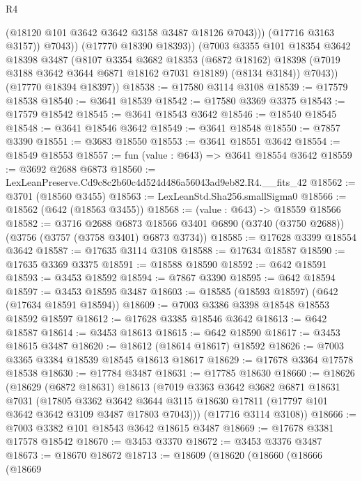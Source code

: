 \begin{lexlean}{R4}
\begin{coremodule}
                    (@18120 @101 @3642 @3642 @3158 @3487 @18126 @7043)))
                (@17716 @3163 @3157))
              @7043))
          (@17770 @18390 @18393))
        (@7003
          @3355
          @101
          @18354
          @3642
          @18398
          @3487
          (@8107
            @3354
            @3682
            @18353
            (@6872 @18162)
            @18398
            (@7019 @3188 @3642 @3644 @6871 @18162 @7031 @18189)
            (@8134 @3184))
          @7043))
      (@17770 @18394 @18397))
@18538 := @17580 @3114 @3108
@18539 := @17579 @18538
@18540 := @3641 @18539
@18542 := @17580 @3369 @3375
@18543 := @17579 @18542
@18545 := @3641 @18543 @3642
@18546 := @18540 @18545
@18548 := @3641 @18546 @3642
@18549 := @3641 @18548
@18550 := @7857 @3390
@18551 := @3683 @18550
@18553 := @3641 @18551 @3642
@18554 := @18549 @18553
@18557 := fun (value : @643) => @3641 @18554 @3642
@18559 := @3692 @2688 @6873
@18560 := LexLeanPreserve.Cd9c8c2b60c4d524d486a56043ad9eb82.R4.__fits_42
@18562 := @3701 (@18560 @3455)
@18563 := LexLeanStd.Sha256.smallSigma0
@18566 := @18562 (@642 (@18563 @3455))
@18568 := (value : @643) -> @18559 @18566
@18582 := @3716
    @2688
    @6873
    @18566
    @3401
    @6890
    (@3740 (@3750 @2688))
    (@3756 (@3757 (@3758 @3401) @6873 @3734))
@18585 := @17628 @3399 @18554 @3642
@18587 := @17635 @3114 @3108
@18588 := @17634 @18587
@18590 := @17635 @3369 @3375
@18591 := @18588 @18590
@18592 := @642 @18591
@18593 := @3453 @18592
@18594 := @7867 @3390
@18595 := @642 @18594
@18597 := @3453 @18595 @3487
@18603 := @18585 (@18593 @18597) (@642 (@17634 @18591 @18594))
@18609 := @7003 @3386 @3398 @18548 @18553 @18592 @18597
@18612 := @17628 @3385 @18546 @3642
@18613 := @642 @18587
@18614 := @3453 @18613
@18615 := @642 @18590
@18617 := @3453 @18615 @3487
@18620 := @18612 (@18614 @18617) @18592
@18626 := @7003 @3365 @3384 @18539 @18545 @18613 @18617
@18629 := @17678 @3364 @17578 @18538
@18630 := @17784 @3487
@18631 := @17785 @18630
@18660 := @18626
    (@18629
      (@6872 @18631)
      @18613
      (@7019
        @3363
        @3642
        @3682
        @6871
        @18631
        @7031
        (@17805
          @3362
          @3642
          @3644
          @3115
          @18630
          @17811
          (@17797 @101 @3642 @3642 @3109 @3487 @17803 @7043)))
      (@17716 @3114 @3108))
@18666 := @7003 @3382 @101 @18543 @3642 @18615 @3487
@18669 := @17678 @3381 @17578 @18542
@18670 := @3453 @3370
@18672 := @3453 @3376 @3487
@18673 := @18670 @18672
@18713 := @18609
    (@18620
      (@18660
        (@18666
          (@18669

\end{coremodule}
\end{lexlean}
